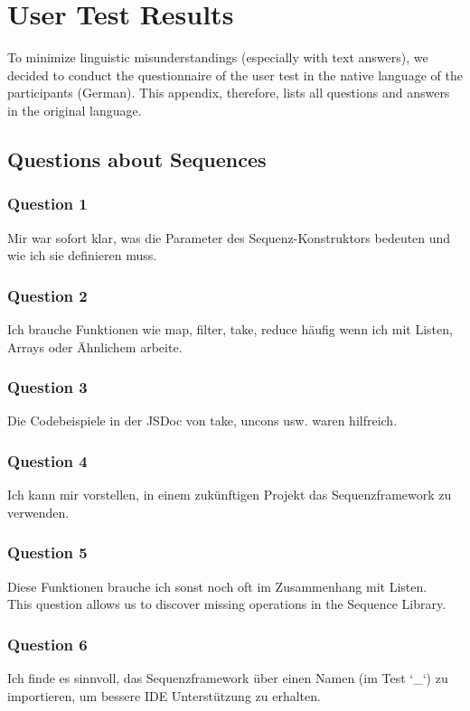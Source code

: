 \chapter{User Test Results}
\label{chap:app_user_test_results}
To minimize linguistic misunderstandings (especially with text answers), we
decided to conduct the questionnaire of the user test in the native language of
the participants (German). This appendix, therefore, lists all questions and
answers in the original language.
\section{Questions about Sequences} %
\label{sec:Questions about Sequences}
\subsection{Question 1}
\label{sub:ut_q1}
Mir war sofort klar, was die Parameter des Sequenz-Konstruktors bedeuten und wie ich sie definieren muss.
\subsection{Question 2}
\label{sub:ut_q2}
Ich brauche Funktionen wie map, filter, take, reduce häufig wenn ich mit Listen, Arrays oder Ähnlichem arbeite.

\subsection{Question 3}
\label{sub:ut_q3}
Die Codebeispiele in der JSDoc von take, uncons usw. waren hilfreich. 
\subsection{Question 4}
\label{sub:ut_q4}
Ich kann mir vorstellen, in einem zukünftigen Projekt das Sequenzframework zu verwenden.
\subsection{Question 5}
Diese Funktionen brauche ich sonst noch oft im Zusammenhang mit Listen. \\
This question allows us to discover missing operations in the Sequence Library.
\label{sub:ut_q5}
\subsection{Question 6}
\label{sub:ut_q6}
Ich finde es sinnvoll, das Sequenzframework über einen Namen (im Test `\_`) zu importieren, um bessere IDE Unterstützung zu erhalten.
